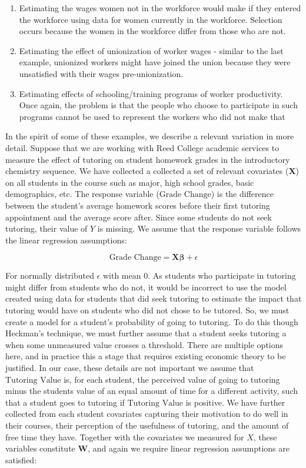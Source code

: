 \documentclass[12pt,twoside]{reedthesis}
\theoremstyle{definition}
\begin{document}
\begin{enumerate}
\item Estimating the wages women not in the workforce would make if they entered the workforce using data for women currently in the workforce. Selection occurs because the women in the workforce differ from those who are not.

\item Estimating the effect of unionization of worker wages - similar to the last example, unionized workers might have joined the union because they were unsatisfied with their wages pre-unionization.

\item Estimating effects of schooling/training programs of worker productivity. Once again, the problem is that the people who choose to participate in such programs cannot be used to represent the workers who did not make that 
\end{enumerate}

In the spirit of some of these examples, we describe a relevant variation in more detail. Suppose that we are working with Reed College academic services to measure the effect of tutoring on student homework grades in the introductory chemistry sequence. We have collected a collected a set of relevant covariates ($\mathbf{X}$) on all students in the course such as major, high school grades, basic demographics, etc. The response variable ($\text{Grade Change}$) is the difference between the student's average homework scores before their first tutoring appointment and the average score after. Since some students do not seek tutoring, their value of $Y$ is missing. We assume that the response variable follows the linear regression assumptions:

$$\text{Grade Change} =   \mathbf{X}\boldsymbol{\beta} + \epsilon$$

For normally distributed $\epsilon$ with mean $0$. As students who participate in tutoring might differ from students who do not, it would be incorrect to use the model created using data for students that did seek tutoring to estimate the impact that tutoring would have on students who did not chose to be tutored. So, we must create a model for a student's probability of going to tutoring. To do this though Heckman's technique, we must further assume that a student seeks tutoring a when some unmeasured value crosses a threshold. There are multiple options here, and in practice this a stage that requires existing economic theory to be justified. In our case, these details are not important we assume that $\text{Tutoring Value}$ is, for each student, the perceived value of going to tutoring minus the students value of an equal amount of time for a different activity, such that a student goes to tutoring if  $\text{Tutoring Value}$ is positive. We have further collected from each student covariates capturing their motivation to do well in their courses, their perception of the usefulness of tutoring, and the amount of free time they have. Together with the covariates we measured for $X$, these variables constitute $\mathbf{\mathbf{W}}$,  and again we require linear regression assumptions are satisfied:
\end{document}
